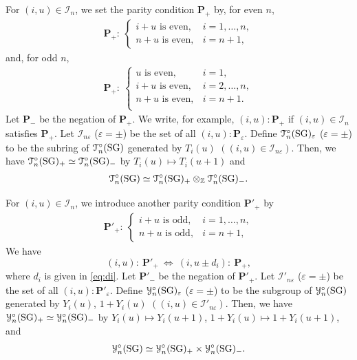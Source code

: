 \documentclass[11pt]{article}
\numberwithin{equation}{section}
\theoremstyle{definition}
\begin{document}
For $(i,u)\in \mathcal{I}_{n}$,
we set the parity condition $\mathbf{P}_{+}$ by,
for even $n$,
\begin{gather*}
\mathbf{P}_{+}: \
\begin{cases}
\mbox{$i+u$ is even},& i=1,\dots,n,\\
\mbox{$n+u$ is even}, & i=n+1,
\end{cases}
\end{gather*}
and, for odd $n$,
\begin{gather*}
\mathbf{P}_{+}: \
\begin{cases}
\mbox{$u$ is even}, & i=1,\\
\mbox{$i+u$ is even}, & i=2,\dots,n, \\
\mbox{$n+u$ is even}, & i=n+1.\\
\end{cases}
\end{gather*}
Let $\mathbf{P}_-$ be the negation of $\mathbf{P}_+$.
We write, for example, $(i,u):\mathbf{P}_{+}$ if $(i,u)\in
\mathcal{I}_n$ satisf\/ies
$\mathbf{P}_{+}$.
Let $\mathcal{I}_{n\varepsilon}$ ($\varepsilon=\pm$)
be the set of all $(i,u):\mathbf{P}_{\varepsilon}$.
Def\/ine $\EuScript{T}^{\circ}_{n}(\mathrm{SG})_{\varepsilon}$
($\varepsilon=\pm$)
to be the subring of $\EuScript{T}^{\circ}_{n}(\mathrm{SG})$
generated by
 $T_i(u)$
$((i,u)\in \mathcal{I}_{n\varepsilon})$.
Then, we have
$\EuScript{T}^{\circ}_{n}(\mathrm{SG})_+
\simeq
\EuScript{T}^{\circ}_{n}(\mathrm{SG})_-
$
by $T_i(u)\mapsto T_i(u+1)$ and
\begin{gather*}
\EuScript{T}^{\circ}_{n}(\mathrm{SG})
\simeq
\EuScript{T}^{\circ}_{n}(\mathrm{SG})_+
\otimes_{\mathbb{Z}}
\EuScript{T}^{\circ}_{n}(\mathrm{SG})_-.
\end{gather*}

For  $(i,u)\in \mathcal{I}_{n}$,
we introduce another parity condition $\mathbf{P}'_{+}$ by
\begin{gather*}
\mathbf{P}'_{+}: \
\begin{cases}
\mbox{$i+u$ is odd},& i=1,\dots,n,\\
\mbox{$n+u$ is odd}, & i=n+1,
\end{cases}
\end{gather*}
We have
\[
(i,u):\ \mathbf{P}'_+ \ \Longleftrightarrow\
  (i,u\pm d_i): \ \mathbf{P}_+,
\]
where $d_i$ is given in \eqref{eq:di}.
Let $\mathbf{P}'_-$ be the negation of $\mathbf{P}'_+$.
Let $\mathcal{I}'_{n\varepsilon}$
($\varepsilon=\pm$)  be
 the set of all $(i,u):\mathbf{P}'_{\varepsilon}$.
Def\/ine $\EuScript{Y}^{\circ}_{n}(\mathrm{SG})_{\varepsilon}$
($\varepsilon=\pm$)
to be the subgroup of $\EuScript{Y}^{\circ}_{n}(\mathrm{SG})$
generated by
$Y_i(u)$, $1+Y_i(u)$
$((i,u)\in \mathcal{I}'_{n\varepsilon})$.
Then, we have
$\EuScript{Y}^{\circ}_{n}(\mathrm{SG})_+
\simeq
\EuScript{Y}^{\circ}_{n}(\mathrm{SG})_-
$
by $Y_i(u)\mapsto Y_i(u+1)$,
$1+Y_i(u)\mapsto 1+Y_i(u+1)$,
 and
\begin{gather*}
\EuScript{Y}^{\circ}_{n}(\mathrm{SG})
\simeq
\EuScript{Y}^{\circ}_{n}(\mathrm{SG})_+
\times
\EuScript{Y}^{\circ}_{n}(\mathrm{SG})_-.
\end{gather*}
\end{document}
